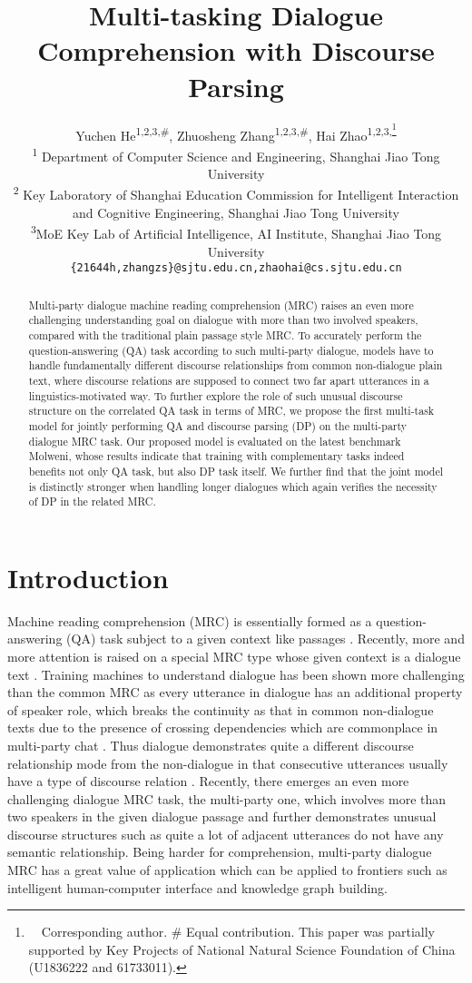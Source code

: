 \documentclass[11pt]{article}
\title{Multi-tasking Dialogue Comprehension with Discourse Parsing}
\author{Yuchen He\textsuperscript{1,2,3,\#}, Zhuosheng Zhang\textsuperscript{1,2,3,\#}, Hai Zhao\textsuperscript{1,2,3,\thanks{\ \ Corresponding author. \# Equal contribution. This paper was partially supported by Key Projects of National Natural Science Foundation of China (U1836222 and 61733011).}}\\
\textsuperscript{1} Department of Computer Science and Engineering, Shanghai Jiao Tong University\\
\textsuperscript{2} Key Laboratory of Shanghai Education Commission for Intelligent Interaction\\
and Cognitive Engineering, Shanghai Jiao Tong University\\
\textsuperscript{3}MoE Key Lab of Artificial Intelligence, AI Institute, Shanghai Jiao Tong University\\
\texttt{\{21644h,zhangzs\}@sjtu.edu.cn,zhaohai@cs.sjtu.edu.cn}\\
}
\date{}
\begin{document}
\maketitle
\begin{abstract}
Multi-party dialogue machine reading comprehension (MRC) raises an even more challenging understanding goal on dialogue with more than two involved speakers, compared with the traditional plain passage style MRC. To accurately perform the question-answering (QA) task according to such multi-party dialogue, models have to handle fundamentally different discourse relationships from common non-dialogue plain text, where discourse relations are supposed to connect two far apart utterances in a linguistics-motivated way.
To further explore the role of such unusual discourse structure on the correlated QA task in terms of MRC, we propose the first multi-task model for jointly performing QA and discourse parsing (DP) on the multi-party dialogue MRC task. Our proposed model is evaluated on the latest benchmark Molweni, whose results indicate that training with complementary tasks indeed benefits not only QA task, but also DP task itself. We further find that the joint model is distinctly stronger when handling longer dialogues which again verifies the necessity of DP in the related MRC.
\end{abstract}


\section{Introduction}\label{sec:introduction}
Machine reading comprehension (MRC) is essentially formed as a question-answering (QA) task subject to a given context like passages \cite{hermann2015teaching,rajpurkar2016squad}. Recently, more and more attention is raised on a special MRC type whose given context is a dialogue text \cite{reddy2019coqa,choi2018quac}. Training machines to understand dialogue has been shown more challenging than the common MRC as every utterance in dialogue has an additional property of speaker role, which breaks the continuity as that in common non-dialogue texts due to the presence of crossing dependencies which are commonplace in multi-party chat \cite{allen1994trains,perez2017dialog}. Thus dialogue demonstrates quite a different discourse relationship mode from the non-dialogue in that consecutive utterances usually have a type of discourse relation \cite{afantenos2015discourse,shi2019deep,li-etal-2020-molweni,DBLP:journals/corr/abs-2104-12377}. Recently, there emerges an even more challenging dialogue MRC task, the multi-party one, which involves more than two speakers in the given dialogue passage \cite{li-etal-2020-molweni,DBLP:journals/corr/abs-2104-12377} and further demonstrates unusual discourse structures such as quite a lot of adjacent utterances do not have any semantic relationship. Being harder for comprehension, multi-party dialogue MRC has a great value of application which can be applied to frontiers such as intelligent human-computer interface and knowledge graph building.
\end{document}
